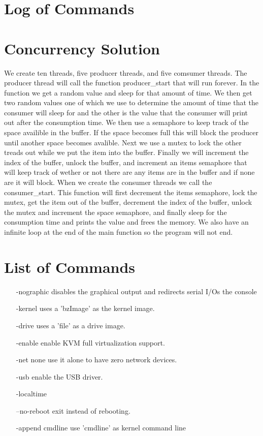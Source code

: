 \documentclass[letterpaper,10pt,titlepage]{article}
\begin{document}
\section{Log of Commands}

\section{Concurrency Solution}
We create ten threads, five producer threads, and five comsumer threads. The
producer thread will call the function producer\_start that will run forever.
In the function we get a random value and sleep for that amount of time. We then
get two random values one of which we use to determine the amount of time that
the consumer will sleep for and the other is the value that the consumer will
print out after the consumption time. We then use a semaphore to keep track 
of the space availible in the buffer. If the space becomes full this will 
block the producer until another space becomes avalible. Next we use a mutex
to lock the other treads out while we put the item into the buffer. Finally we
will increment the index of the buffer, unlock the buffer, and increment an 
items semaphore that will keep track of wether or not there are any items are 
in the buffer and if none are it will block. When we create the consumer 
threads we call the consumer\_start. This function will first decrement the 
items semaphore, lock the mutex, get the item out of the buffer, decrement the 
index of the buffer, unlock the mutex and increment the space semaphore, and 
finally sleep for the consumption time and prints the value and frees the 
memory. We also have an infinite loop at the end of the main function so the 
program will not end.

\section{List of Commands}
\begin{enumerate}
   \item[-nographic] disables the graphical output and redirects serial I/Os the console
   \item[-kernel] uses a 'bzImage' as the kernel image.
   \item[-drive] uses a 'file' as a drive image.
   \item[-enable] enable KVM full virtualization support.
   \item[-net none] use it alone to have zero network devices.
   \item[-usb] enable the USB driver.
   \item[-localtime] 
   \item[--no-reboot] exit instead of rebooting.
   \item[-append] cmdline use 'cmdline' as kernel command line
\end{enumerate}
\end{document}
